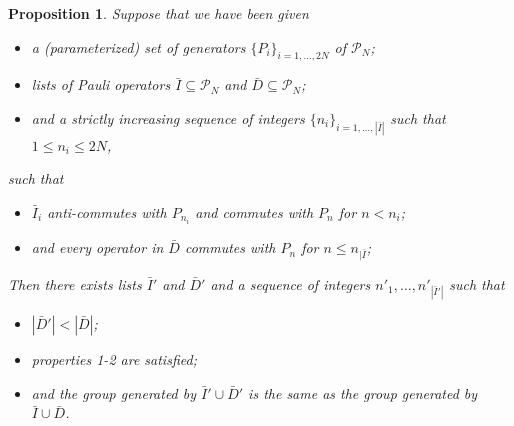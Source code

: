 \documentclass[twocolumn,showpacs,preprintnumbers,amsmath,amssymb,nofootinbib,pra,floatfix]{revtex4}
\newtheorem{proposition}{Proposition}
\newcommand{\lst}{\bar}
\begin{document}
\begin{proposition}
\label{make-independent-using-elimination}
Suppose that we have been given
\begin{itemize}
\item a (parameterized) set of generators $\{P_i\}_{i=1,\dots,2N}$ of $\mathscr{P}_N$;
\item lists of Pauli operators $\lst I\subseteq \mathscr{P}_N$ and  $\lst D\subseteq \mathscr{P}_N$;
\item and a strictly increasing sequence of integers $\{n_i\}_{i=1,\dots,|\lst I|}$ such that $1\le n_i \le 2N$,
\end{itemize}
such that
\begin{itemize}
\item \label{independent-of-below} $\lst I_i$ anti-commutes with $P_{n_i}$ and commutes with $P_n$ for $n<n_i$;
\item \label{empty-of-paulis-before-index} and every operator in $\lst D$ commutes with $P_n$ for $n\le n_{|\lst I}$;
\end{itemize}
Then there exists lists $\lst I'$ and $\lst D'$ and a sequence of integers $n'_1,\dots,n'_{|\lst I'|}$ such that
\begin{itemize}
\item $|\lst D'|<|\lst D|$;
\item properties 1-2 are satisfied;
\item and the group generated by $\lst I'\cup \lst D'$ is the same as the group generated by $\lst I \cup \lst D$.
\end{itemize}
\end{proposition}
\end{document}
